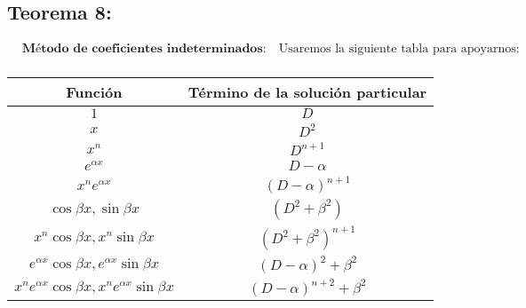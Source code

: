 \documentclass[a4paper,12pt,numbers=noenddot]{scrreprt}
\begin{document}
\subsection*{Teorema 8:}
\begin{align*}
    &\textbf{Método de coeficientes indeterminados:} \quad \text{Usaremos la siguiente tabla para apoyarnos:}\\
\end{align*}

\begin{tabular}{|c|c|}
    \hline
    Función & Término de la solución particular\\
    \hline
    \(1\) & \(D\)\\
    \(x\) & \(D^2\)\\
    \(x^n\) & \(D^{n+1}\)\\
    \(e^{\alpha x}\) & \(D-\alpha\)\\
    \(x^{n} e^{\alpha x}\) & \({(D - \alpha)}^{n+1}\)\\
    \(\cos \beta x , \sin \beta x\) & \({(D^2 + \beta^2)}\)\\
    \(x^n \cos \beta x , x^n \sin \beta x\) & \({(D^2 + \beta^2)}^{n+1}\)\\
    \(e^{\alpha x} \cos \beta x , e^{\alpha x} \sin \beta x\) & \({(D - \alpha)}^2 + \beta^2\)\\
    \(x^n e^{\alpha x} \cos \beta x , x^n e^{\alpha x} \sin \beta x\) & \({(D - \alpha)}^{n+2} + \beta^2\)\\
    \hline
\end{tabular}

    
\end{document}
